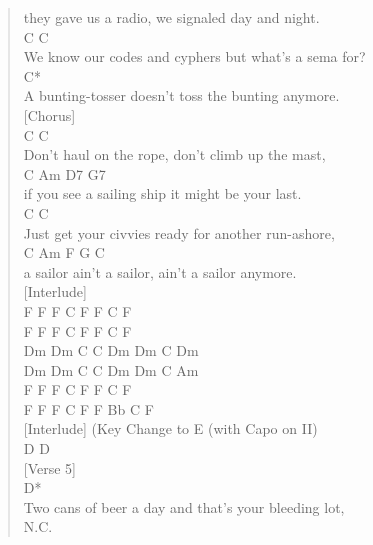 \documentclass[11pt]{article}
\begin{document}
\begin{verse}
they gave us a radio, we signaled day and night.\\
\hspace*{3em}C                              C\\
We know our codes and cyphers but what's a sema for?\\
\hspace*{2em}C*\\
A bunting-tosser doesn't toss the bunting anymore.\\
\vspace*{1em}
[Chorus]\\
\hspace*{6em}C                       C\\
Don't haul on the rope, don't climb up the mast,\\
C            Am              D7            G7\\
if you see a sailing ship it might be your last.\\
\hspace*{5em}C                           C\\
Just get your civvies ready for another run-ashore,\\
\hspace*{2em}C              Am              F      G  C\\
a sailor ain't a sailor, ain't a sailor anymore.\\
\vspace*{1em}
[Interlude]\\
F      F      F      C            F      F      C      F\\
F      F      F      C            F      F      C      F\\
Dm     Dm     C      C            Dm     Dm     C      Dm\\
Dm     Dm     C      C            Dm     Dm     C      Am\\
F      F      F      C            F      F      C      F\\
F      F      F      C            F      F      Bb C   F\\
\vspace*{1em}
[Interlude] (Key Change to E (with Capo on II)\\
D        D\\
\vspace*{1em}
[Verse 5]\\
D*\\
Two cans of beer a day and that's your bleeding lot,\\
\hspace*{4em}N.C.\\

\end{verse}
\end{document}
